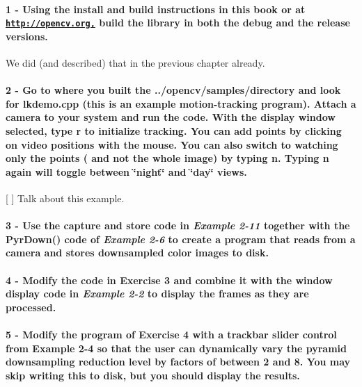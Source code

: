 \paragraph*{1 -\/ Using the install and build instructions in this book or at \href{http://opencv.org,}{\tt http\+://opencv.\+org,} build the library in both the debug and the release versions.}

We did (and described) that in the previous chapter already.

\paragraph*{2 -\/ Go to where you built the {\ttfamily ../opencv/samples/directory} and look for {\ttfamily lkdemo.\+cpp} (this is an example motion-\/tracking program). Attach a camera to your system and run the code. With the display window selected, type {\bfseries r} to initialize tracking. You can add points by clicking on video positions with the mouse. You can also switch to watching only the points ( and not the whole image) by typing {\bfseries n}. Typing {\bfseries n} again will toggle between \char`\"{}night\char`\"{} and \char`\"{}day\char`\"{} views.}


\begin{DoxyItemize}
\item \mbox{[} \mbox{]} Talk about this example.
\end{DoxyItemize}

\paragraph*{3 -\/ Use the capture and store code in {\itshape Example 2-\/11} together with the {\ttfamily Pyr\+Down()} code of {\itshape Example 2-\/6} to create a program that reads from a camera and stores downsampled color images to disk.}

\paragraph*{4 -\/ Modify the code in Exercise 3 and combine it with the window display code in {\itshape Example 2-\/2} to display the frames as they are processed.}

\paragraph*{5 -\/ Modify the program of Exercise 4 with a trackbar slider control from Example 2-\/4 so that the user can dynamically vary the pyramid downsampling reduction level by factors of between 2 and 8. You may skip writing this to disk, but you should display the results.}


\begin{DoxyCodeInclude}
\end{DoxyCodeInclude}
 